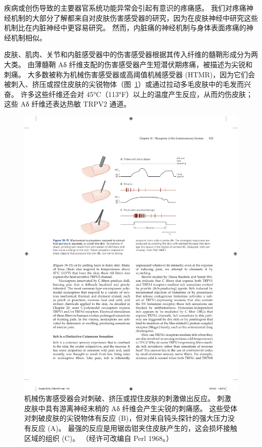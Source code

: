 疾病或创伤导致的主要器官系统功能异常会引起有意识的疼痛感。
我们对疼痛神经机制的大部分了解都来自对皮肤伤害感受器的研究，因为在皮肤神经中研究这些机制比在内脏神经中更容易研究。
然而，内脏痛的神经机制与身体表面疼痛的神经机制相似。


皮肤、肌肉、关节和内脏感受器中的伤害感受器根据其传入纤维的髓鞘形成分为两大类。
由薄髓鞘 Aδ 纤维支配的伤害感受器产生短潜伏期疼痛，被描述为尖锐和刺痛。
大多数被称为机械伤害感受器或高阈值机械感受器 (HTMR)，因为它们会被刺入、挤压或捏住皮肤的尖锐物体（图~\ref{fig:18_11}）或通过拉动多毛皮肤中的毛发而兴奋。
许多这些纤维还会对 45°C（113°F）以上的温度产生反应，从而灼伤皮肤；
这些 Aδ 纤维还表达热敏 TRPV2 通道。


\begin{figure}[htbp]
	\centering
	\includegraphics[width=1.0\linewidth]{chap18/fig_18_11}
	\caption{机械伤害感受器会对刺破、挤压或捏住皮肤的刺激做出反应。
		刺激皮肤中具有游离神经末梢的 Aδ 纤维会产生尖锐的刺痛感。
		这些受体对刺破皮肤的尖锐物体有反应 (B)，但对来自钝头探针的强大压力没有反应 (A)。
		最强的反应是用锯齿钳夹住皮肤产生的，这会损坏接触区域的组织 (C)。 （经许可改编自 Perl 1968。）}
	\label{fig:18_11}
\end{figure}


